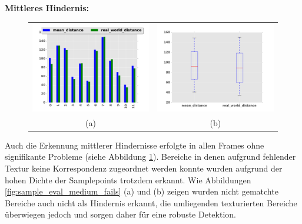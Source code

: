 \noindent
\textbf{Mittleres Hindernis:}\\

\begin{figure}[h]
	\centering
	\begin{tabular}{cc}
	\includegraphics[width=7cm]{img/evaluation/diagrams/sample_medium_bar}&
	\includegraphics[width=7cm]{img/evaluation/diagrams/sample_medium_box}\\
	 (a) & (b)
	\end{tabular}
	\caption{}
    \label{fig:sample_eval_medium}
\end{figure}

\noindent
Auch die Erkennung mittlerer Hindernisse erfolgte in allen Frames ohne signifikante Probleme (siehe Abbildung \ref{fig:sample_eval_medium}). Bereiche in denen aufgrund fehlender Textur keine Korrespondenz zugeordnet werden konnte wurden aufgrund der hohen Dichte der Samplepoints trotzdem erkannt. Wie Abbildungen \ref{fig:sample_eval_medium_fails} (a) und (b) zeigen wurden nicht gematchte Bereiche auch nicht als Hindernis erkannt, die umliegenden texturierten Bereiche überwiegen jedoch und sorgen daher für eine robuste Detektion.

